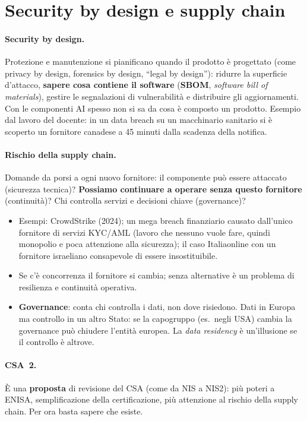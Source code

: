 \section{Security by design e supply chain}
\paragraph{Security by design.} Protezione e manutenzione si pianificano quando il prodotto è progettato
(come privacy by design, forensics by design, ``legal by design''): ridurre la superficie d'attacco,
\textbf{sapere cosa contiene il software} (\textbf{SBOM}, \emph{software bill of materials}), gestire le
segnalazioni di vulnerabilità e distribuire gli aggiornamenti. Con le componenti AI spesso non si sa da
cosa è composto un prodotto. Esempio dal lavoro del docente: in un data breach su un macchinario
sanitario si è scoperto un fornitore canadese a 45 minuti dalla scadenza della notifica.

\paragraph{Rischio della supply chain.} Domande da porsi a ogni nuovo fornitore: il componente può
essere attaccato (sicurezza tecnica)? \textbf{Possiamo continuare a operare senza questo fornitore}
(continuità)? Chi controlla servizi e decisioni chiave (governance)?
\begin{itemize}
  \item Esempi: CrowdStrike (2024); un mega breach finanziario causato dall'unico fornitore di servizi
    KYC/AML (lavoro che nessuno vuole fare, quindi monopolio e poca attenzione alla sicurezza); il caso
    Italiaonline con un fornitore israeliano consapevole di essere insostituibile.
  \item Se c'è concorrenza il fornitore si cambia; senza alternative è un problema di resilienza e
    continuità operativa.
  \item \textbf{Governance}: conta chi controlla i dati, non dove risiedono. Dati in Europa ma controllo in
    un altro Stato: se la capogruppo (es.\ negli USA) cambia la governance può chiudere l'entità europea.
    La \emph{data residency} è un'illusione se il controllo è altrove.
\end{itemize}

\paragraph{CSA~2.} È una \textbf{proposta} di revisione del CSA (come da NIS a NIS2): più poteri a ENISA,
semplificazione della certificazione, più attenzione al rischio della supply chain. Per ora basta sapere
che esiste.

